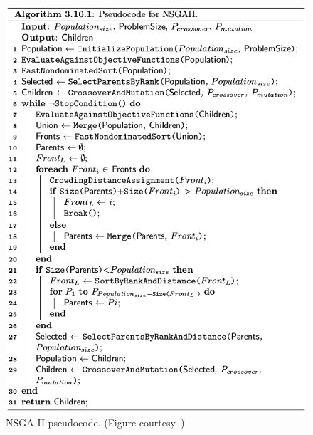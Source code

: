 \begin{figure}[t]
\includegraphics[width=\linewidth]{figs/nsgaii.png}
\caption{NSGA-II pseudocode. (Figure courtesy~\cite{clever})}
\label{fig:nsgaII}
\end{figure}